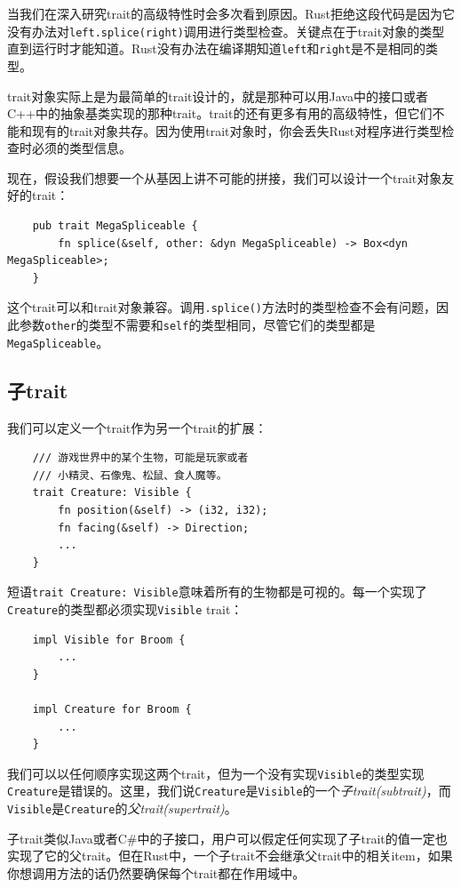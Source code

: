 当我们在深入研究trait的高级特性时会多次看到原因。Rust拒绝这段代码是因为它没有办法对\texttt{left.splice(right)}调用进行类型检查。关键点在于trait对象的类型直到运行时才能知道。Rust没有办法在编译期知道\texttt{left}和\texttt{right}是不是相同的类型。

trait对象实际上是为最简单的trait设计的，就是那种可以用Java中的接口或者C++中的抽象基类实现的那种trait。trait的还有更多有用的高级特性，但它们不能和现有的trait对象共存。因为使用trait对象时，你会丢失Rust对程序进行类型检查时必须的类型信息。

现在，假设我们想要一个从基因上讲不可能的拼接，我们可以设计一个trait对象友好的trait：
\begin{verbatim}
    pub trait MegaSpliceable {
        fn splice(&self, other: &dyn MegaSpliceable) -> Box<dyn MegaSpliceable>;
    }
\end{verbatim}

这个trait可以和trait对象兼容。调用\texttt{.splice()}方法时的类型检查不会有问题，因此参数\texttt{other}的类型不需要和\texttt{self}的类型相同，尽管它们的类型都是\texttt{MegaSpliceable}。

\subsection{子trait}\label{subtrait}
我们可以定义一个trait作为另一个trait的扩展：
\begin{verbatim}
    /// 游戏世界中的某个生物，可能是玩家或者
    /// 小精灵、石像鬼、松鼠、食人魔等。
    trait Creature: Visible {
        fn position(&self) -> (i32, i32);
        fn facing(&self) -> Direction;
        ...
    }
\end{verbatim}

短语\texttt{trait Creature: Visible}意味着所有的生物都是可视的。每一个实现了\texttt{Creature}的类型都必须实现\texttt{Visible} trait：
\begin{verbatim}
    impl Visible for Broom {
        ...
    }

    impl Creature for Broom {
        ...
    }
\end{verbatim}
我们可以以任何顺序实现这两个trait，但为一个没有实现\texttt{Visible}的类型实现\texttt{Creature}是错误的。这里，我们说\texttt{Creature}是\texttt{Visible}的一个\emph{子trait(subtrait)}，而\texttt{Visible}是\texttt{Creature}的\emph{父trait(supertrait)}。

子trait类似Java或者C\#中的子接口，用户可以假定任何实现了子trait的值一定也实现了它的父trait。但在Rust中，一个子trait不会继承父trait中的相关item，如果你想调用方法的话仍然要确保每个trait都在作用域中。

